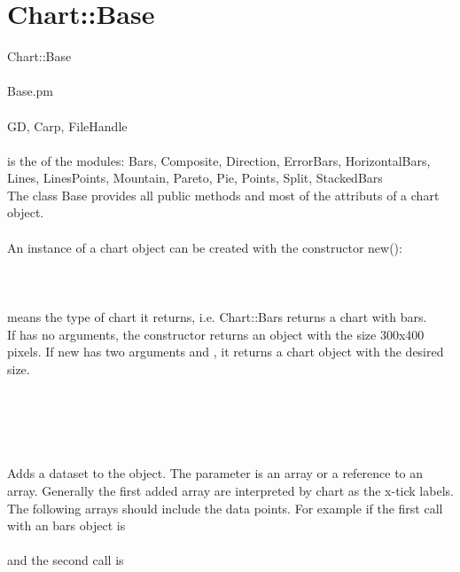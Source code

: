 \section{Chart::Base}
 Chart::Base\\ \\
 Base.pm\\ \\
GD, Carp, FileHandle\\ \\
  is the  of the modules: Bars, Composite, Direction, ErrorBars, HorizontalBars, Lines, LinesPoints, Mountain, Pareto, Pie, Points, Split, StackedBars\\
The class Base provides all public methods and most of the attributs of a chart object.\\
\\
 An instance of a chart object can be created with the constructor new():\\
\\
\\
\\
 means the type of chart it returns, i.e. Chart::Bars returns a chart with bars.\\
If  has no arguments, the constructor returns an object with the size 300x400 pixels. If new has two arguments  and , it returns a chart object with the desired size. \\ 
\\ 
\label{methods}\\
\\
\\ \\
Adds a dataset to the object. The parameter is an array or a reference to an array. Generally the first added array are interpreted by chart as the x-tick labels. The following arrays should include the data points. For example if the first call with an bars object is\\
\\
  and the second call is\\ \\
\\
